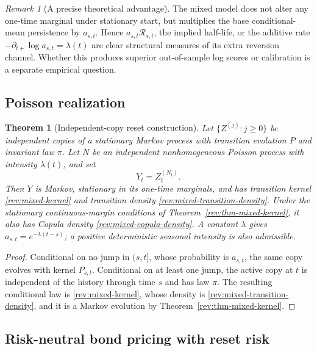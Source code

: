 \documentclass[11pt]{article}
\newtheorem{theorem}[definition]{Theorem}
\theoremstyle{remark}
\newtheorem{remark}[definition]{Remark}
\begin{document}
\begin{remark}[A precise theoretical advantage]
The mixed model does not alter any one-time marginal under stationary start,
but multiplies the base conditional-mean persistence by $a_{s,t}$.  Hence
$a_{s,t}\mathcal R_{s,t}$, the implied half-life, or the additive rate
$-\partial_{t+}\log a_{s,t}=\lambda(t)$ are clear structural measures of its
extra reversion channel.  Whether this produces superior out-of-sample log
scores or calibration is a separate empirical question.
\end{remark}

\subsection{Poisson realization}

\begin{theorem}[Independent-copy reset construction]
\label{rev:thm-poisson-construction}
Let $\{Z^{(j)}:j\ge0\}$ be independent copies of a stationary Markov process
with transition evolution $P$ and invariant law $\pi$.  Let $N$ be an
independent nonhomogeneous Poisson process with intensity $\lambda(t)$, and set
\begin{equation}
Y_t=Z_t^{(N_t)}.
\label{rev:poisson-copy-process}
\end{equation}
Then $Y$ is Markov, stationary in its one-time marginals, and has transition
kernel \eqref{rev:mixed-kernel} and transition density
\eqref{rev:mixed-transition-density}.  Under the stationary continuous-margin
conditions of Theorem~\ref{rev:thm-mixed-kernel}, it also has Copula density
\eqref{rev:mixed-copula-density}.  A constant $\lambda$ gives
$a_{s,t}=e^{-\lambda(t-s)}$; a positive deterministic seasonal intensity is
also admissible.
\end{theorem}

\begin{proof}
Conditional on no jump in $(s,t]$, whose probability is $a_{s,t}$, the same
copy evolves with kernel $P_{s,t}$.  Conditional on at least one jump, the
active copy at $t$ is independent of the history through time $s$ and has law
$\pi$.  The resulting conditional law is \eqref{rev:mixed-kernel}, whose
density is \eqref{rev:mixed-transition-density}, and it is a
Markov evolution by Theorem~\ref{rev:thm-mixed-kernel}.
\end{proof}

\subsection{Risk-neutral bond pricing with reset risk}
\end{document}

